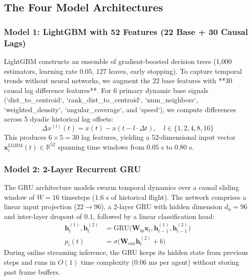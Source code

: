 \documentclass[9pt]{ieeeconf}
\newcommand{\RR}{\mathbb{R}}
\begin{document}
\subsection{The Four Model Architectures}

\subsubsection{Model 1: LightGBM with 52 Features (22 Base + 30 Causal Lags)}
LightGBM constructs an ensemble of gradient-boosted decision trees (1,000 estimators, learning rate $0.05$, 127 leaves, early stopping). To capture temporal trends without neural networks, we augment the 22 base features with **30 causal lag difference features**. For 6 primary dynamic base signals (`dist_to_centroid`, `rank_dist_to_centroid`, `num_neighbors`, `weighted_density`, `angular_coverage`, and `speed`), we compute differences across 5 dyadic historical lag offsets:
\begin{equation}
\Delta x^{(l)}(t) = x(t) - x(t - l \cdot \Delta t), \quad l \in \{1, 2, 4, 8, 16\}
\end{equation}
This produces $6 \times 5 = 30$ lag features, yielding a 52-dimensional input vector $\mathbf{x}_i^{\text{LGBM}}(t) \in \RR^{52}$ spanning time windows from $0.05\text{ s}$ to $0.80\text{ s}$.

\subsubsection{Model 2: 2-Layer Recurrent GRU}
The GRU architecture models swarm temporal dynamics over a causal sliding window of $W = 16$ timesteps ($1.6\text{ s}$ of historical flight). The network comprises a linear input projection ($22 \to 96$), a 2-layer GRU with hidden dimension $d_h = 96$ and inter-layer dropout of $0.1$, followed by a linear classification head:
\begin{align}
\mathbf{h}_t^{(1)}, \mathbf{h}_t^{(2)} &= \text{GRU}\big(\mathbf{W}_{\text{in}} \mathbf{x}_t, \mathbf{h}_{t-1}^{(1)}, \mathbf{h}_{t-1}^{(2)}\big) \\
p_i(t) &= \sigma\big(\mathbf{W}_{\text{out}} \mathbf{h}_t^{(2)} + b\big)
\end{align}
During online streaming inference, the GRU keeps its hidden state from previous steps and runs in $O(1)$ time complexity ($0.06\text{ ms}$ per agent) without storing past frame buffers.
\end{document}
